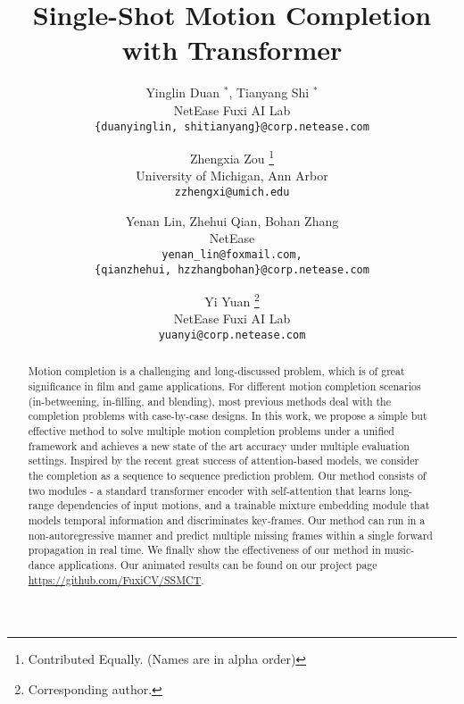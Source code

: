 \documentclass[10pt,twocolumn,letterpaper]{article}
\begin{document}
\title{Single-Shot Motion Completion with Transformer}

\author{Yinglin Duan $^*$, Tianyang Shi $^*$\\
NetEase Fuxi AI Lab\\
{\tt\small \{duanyinglin, shitianyang\}@corp.netease.com}
\and
Zhengxia Zou \thanks{Contributed Equally. (Names are in alpha order)}\\
University of Michigan, Ann Arbor\\
{\tt\small zzhengxi@umich.edu}
\and
Yenan Lin, Zhehui Qian, Bohan Zhang\\
NetEase \\
{\tt\small yenan\_lin@foxmail.com,}\\
{\tt\small \{qianzhehui, hzzhangbohan\}@corp.netease.com}
\and
Yi Yuan \thanks{Corresponding author.}\\
NetEase Fuxi AI Lab\\
{\tt\small yuanyi@corp.netease.com}
}

\maketitle

\ificcvfinal\thispagestyle{empty}\fi

\begin{abstract}
Motion completion is a challenging and long-discussed problem, which is of great significance in film and game applications. For different motion completion scenarios (in-betweening, in-filling, and blending), most previous methods deal with the completion problems with case-by-case designs. In this work, we propose a simple but effective method to solve multiple motion completion problems under a unified framework and achieves a new state of the art accuracy under multiple evaluation settings. Inspired by the recent great success of attention-based models, we consider the completion as a sequence to sequence prediction problem. Our method consists of two modules - a standard transformer encoder with self-attention that learns long-range dependencies of input motions, and a trainable mixture embedding module that models temporal information and discriminates key-frames. Our method can run in a non-autoregressive manner and predict multiple missing frames within a single forward propagation in real time. We finally show the effectiveness of our method in music-dance applications. Our animated results can be found on our project page \url{https://github.com/FuxiCV/SSMCT}.
\end{abstract}
\end{document}
